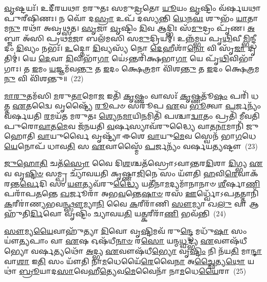 \-\ul{𑌵𑍃}\-𑌷𑍍𑌟𑌯𑌃᳴। 𑌉𑌦𑍀᳴𑌰𑌯𑌥𑌾 𑌮𑌰𑍁𑌤𑌃 𑌸𑌮𑍁\-\ul{𑌦𑍍𑌰}\-𑌤𑍋 \ul{𑌯𑍂}\-𑌯𑌂 \ul{𑌵𑍃}\-𑌷𑍍𑌟𑌿𑌂 𑌵᳴𑌰𑍍\mbox{}𑌷𑌯𑌥𑌾 𑌪𑍁𑌰𑍀𑌷𑌿𑌣𑌃। 𑌨 𑌵𑍋᳴ 𑌦\-\ul{𑌸𑍍𑌰𑌾} 𑌉𑌪᳴ 𑌦𑌸𑍍𑌯𑌨𑍍𑌤𑌿 \ul{𑌧𑍇}\-𑌨\-\ul{𑌵𑌃} 𑌶𑍁𑌭𑌂᳴ \ul{𑌯𑌾}\-𑌤𑌾𑌮\-\ul{𑌨𑍁} 𑌰𑌥𑌾᳴ 𑌅𑌵𑍃𑌥𑍍𑌸𑌤। \ul{𑌸𑍃}\-𑌜𑌾 \ul{𑌵𑍃}\-𑌷𑍍𑌟𑌿𑌂 \ul{𑌦𑌿}\-𑌵 𑌆𑌦𑍍𑌭𑌿𑌃 𑌸᳴\-\ul{𑌮𑍁}\-𑌦𑍍𑌰𑌂 𑌪𑍃᳴𑌣। \ul{𑌅}\-𑌬𑍍𑌜𑌾 𑌅᳴𑌸𑌿 𑌪𑍍𑌰𑌥\-\ul{𑌮}\-𑌜𑌾 𑌬𑌲᳴𑌮𑌸𑌿 𑌸\-\ul{𑌮𑍁}\-𑌦𑍍𑌰𑌿𑌯𑌮𑍍॑। 𑌉𑌨𑍍𑌨᳴𑌮𑍍𑌭𑌯 𑌪𑍃\-\ul{𑌥𑌿}\-𑌵𑍀\-\ul{𑌮𑍍𑌭𑌿}\-𑌨𑍍𑌦𑍍𑌧𑍀𑌦𑌂 \ul{𑌦𑌿}\-𑌵𑍍𑌯𑌂 𑌨𑌭𑌃᳴। \ul{𑌉}\-𑌦𑍍𑌨𑍋 \ul{𑌦𑌿}\-𑌵𑍍𑌯𑌸𑍍𑌯᳴ 𑌨𑍋 \ul{𑌦𑍇}\-𑌹𑍀𑌶𑌾᳴\-\ul{𑌨𑍋} 𑌵𑌿 𑌸𑍃᳴\-\ul{𑌜𑌾} 𑌦𑍃𑌤𑌿𑌮𑍍॑। 𑌯𑍇 \ul{𑌦𑍇}\-𑌵𑌾 \ul{𑌦𑌿}\-𑌵𑌿𑌭𑌾᳴\-\ul{𑌗𑌾} 𑌯𑍇॑\-𑌽𑌨𑍍𑌤𑌰𑌿᳴𑌕𑍍𑌷𑌭𑌾\-\ul{𑌗𑌾} 𑌯𑍇 𑌪𑍃᳴\-\ul{𑌥𑌿}\-𑌵𑌿𑌭𑌾᳴𑌗𑌾𑌃। 𑌤 \ul{𑌇}\-𑌮𑌂 \ul{𑌯}\-𑌜𑍍𑌞𑌮᳴𑌵\-\ul{𑌨𑍍𑌤𑍁} 𑌤 \ul{𑌇}\-𑌦𑌂 𑌕𑍍𑌷𑍇\-\ul{𑌤𑍍𑌰}\-𑌮𑌾 𑌵𑌿᳴𑌶\-\ul{𑌨𑍍𑌤𑍁} 𑌤 \ul{𑌇}\-𑌦𑌂 𑌕𑍍𑌷𑍇\-\ul{𑌤𑍍𑌰}\-𑌮\-\ul{𑌨𑍁} 𑌵𑌿 𑌵𑌿᳴𑌶𑌨𑍍𑌤𑍁॥~(22)

{\anuvakamend[{\-\ul{𑌯}\-\-\ul{𑌨𑍍𑌤𑌿} \ul{𑌦𑍇}\-𑌵𑌾 𑌵𑌿𑍞᳴𑌶\-\ul{𑌤𑌿}\-𑌶𑍍𑌚᳴}]}%

\-\ul{𑌮𑌾}\-\-\ul{𑌰𑍁}\-𑌤𑌮᳴𑌸𑌿 \ul{𑌮}\-𑌰𑍁\-\ul{𑌤𑌾}\-𑌮𑍋\-\ul{𑌜} 𑌇𑌤𑌿᳴ \ul{𑌕𑍃}\-𑌷𑍍𑌣𑌂 𑌵𑌾𑌸𑌃᳴ \ul{𑌕𑍃}\-𑌷𑍍𑌣𑌤𑍂᳴\-\ul{𑌷𑌂} 𑌪𑌰𑌿᳴ 𑌧𑌤𑍍𑌤 \ul{𑌏}\-𑌤𑌦𑍍𑌵𑍈 𑌵𑍃𑌷𑍍𑌟𑍍𑌯𑍈᳴ \ul{𑌰𑍂}\-𑌪𑍞 𑌸𑌰𑍂᳴𑌪 \ul{𑌏}\-𑌵 \ul{𑌭𑍂}\-𑌤𑍍𑌵𑌾 \ul{𑌪}\-𑌰𑍍𑌜𑌨𑍍𑌯𑌂᳴ 𑌵𑌰𑍍\mbox{}𑌷𑌯𑌤𑌿 \ul{𑌰}\-𑌮𑌯᳴𑌤 𑌮𑌰𑍁𑌤𑌃 \ul{𑌶𑍍𑌯𑍇}\-𑌨\-\ul{𑌮𑌾}\-𑌯𑌿\-\ul{𑌨}\-𑌮𑌿𑌤𑌿᳴ 𑌪𑌶𑍍𑌚𑌾\-\ul{𑌦𑍍𑌵𑌾}\-𑌤𑌂 𑌪𑍍𑌰𑌤𑌿᳴ 𑌮𑍀𑌵𑌤𑌿 𑌪𑍁𑌰𑍋\-\ul{𑌵𑌾}\-𑌤\-\ul{𑌮𑍇}\-𑌵 𑌜᳴𑌨𑌯𑌤𑌿 \ul{𑌵}\-𑌰𑍍\mbox{}𑌷𑌸𑍍𑌯𑌾𑌵᳴𑌰𑍁𑌦𑍍𑌧𑍍𑌯𑍈 𑌵𑌾𑌤\-\ul{𑌨𑌾}\-𑌮𑌾𑌨𑌿᳴ 𑌜𑍁𑌹𑍋𑌤𑌿 \ul{𑌵𑌾}\-𑌯𑍁𑌰𑍍𑌵𑍈 𑌵𑍃𑌷𑍍𑌟𑍍𑌯𑌾᳴ 𑌈𑌶𑍇 \ul{𑌵𑌾}\-𑌯𑍁\-\ul{𑌮𑍇}\-𑌵 𑌸𑍍𑌵𑍇𑌨᳴ 𑌭𑌾\-\ul{𑌗}\-𑌧𑍇\-\ul{𑌯𑍇}\-𑌨𑍋𑌪᳴ 𑌧𑌾𑌵\-\ul{𑌤𑌿} 𑌸 \ul{𑌏}\-𑌵𑌾𑌸𑍍𑌮𑍈᳴ \ul{𑌪}\-𑌰𑍍𑌜𑌨𑍍𑌯𑌂᳴ 𑌵𑌰𑍍\mbox{}𑌷𑌯\-\ul{𑌤𑍍𑌯}\-𑌷𑍍𑌟𑍗~(23)

\-\ul{𑌜𑍁}\-\-\ul{𑌹𑍋}\-\-\ul{𑌤𑌿} 𑌚𑌤᳴\-\ul{𑌸𑍍𑌰𑍋} 𑌵𑍈 𑌦𑌿\-\ul{𑌶}\-𑌶𑍍𑌚𑌤᳴𑌸𑍍𑌰𑍋\-𑌽𑌵𑌾𑌨𑍍𑌤𑌰\-\ul{𑌦𑌿}\-𑌶𑌾 \ul{𑌦𑌿}\-𑌗𑍍𑌭𑍍𑌯 \ul{𑌏}\-𑌵 𑌵𑍃\-\ul{𑌷𑍍𑌟𑌿}\-\-\ul{𑍞} 𑌸𑌮𑍍𑌪𑍍𑌰 𑌚𑍍𑌯𑌾᳴𑌵𑌯𑌤𑌿 𑌕𑍃𑌷𑍍𑌣𑌾\-\ul{𑌜𑌿}\-𑌨𑍇 𑌸𑌂 𑌯𑍗᳴𑌤𑌿 \ul{𑌹}\-𑌵𑌿\-\ul{𑌰𑍇}\-𑌵𑌾𑌕᳴𑌰𑌨𑍍𑌤\-\ul{𑌰𑍍𑌵𑍇}\-𑌦𑌿 𑌸𑌂 \ul{𑌯𑍗}\-𑌤𑍍𑌯𑌵᳴𑌰𑍁\-\ul{𑌦𑍍𑌧𑍍𑌯𑍈} 𑌯𑌤𑍀᳴𑌨𑌾\-\ul{𑌮}\-𑌦𑍍𑌯𑌮𑌾᳴𑌨𑌾𑌨𑌾𑍞 \ul{𑌶𑍀}\-𑌰𑍍\mbox{}𑌷𑌾\-\ul{𑌣𑌿} 𑌪𑌰𑌾᳴𑌪\-\ul{𑌤}\-𑌨𑍍𑌤𑍇 \ul{𑌖}\-𑌰𑍍𑌜𑍂𑌰𑌾᳴ 𑌅𑌭\-\ul{𑌵}\-𑌨𑍍𑌤𑍇\-\ul{𑌷𑌾}\-\-\ul{𑍞} 𑌰𑌸᳴ \ul{𑌊}\-𑌰𑍍𑌧𑍍𑌵𑍋᳴\-𑌽𑌪\-\ul{𑌤}\-𑌤𑍍𑌤𑌾𑌨𑌿᳴ \ul{𑌕}\-𑌰𑍀𑌰𑌾॑𑌣𑍍𑌯𑌭𑌵\-\ul{𑌨𑍍𑌥𑍍𑌸𑍗}\-𑌮𑍍𑌯𑌾\-\ul{𑌨𑌿} 𑌵𑍈 \ul{𑌕}\-𑌰𑍀𑌰𑌾᳴𑌣𑌿 \ul{𑌸𑍗}\-𑌮𑍍𑌯𑌾 𑌖\-\ul{𑌲𑍁} 𑌵𑌾 𑌆𑌹𑍁᳴𑌤𑌿\-\ul{𑌰𑍍𑌦𑌿}\-𑌵𑍋 𑌵𑍃𑌷𑍍𑌟𑌿𑌂᳴ 𑌚𑍍𑌯𑌾𑌵𑌯\-\ul{𑌤𑌿} 𑌯\-\ul{𑌤𑍍𑌕}\-𑌰𑍀𑌰𑌾᳴\-\ul{𑌣𑌿} 𑌭𑌵᳴𑌨𑍍𑌤𑌿~(24)

\-\ul{𑌸𑍗}\-𑌮𑍍𑌯\-\ul{𑌯𑍈}\-𑌵𑌾𑌹𑍁᳴𑌤𑍍𑌯𑌾 \ul{𑌦𑌿}\-𑌵𑍋 𑌵𑍃\-\ul{𑌷𑍍𑌟𑌿}\-𑌮𑌵᳴ 𑌰𑍁\-\ul{𑌨𑍍𑌦𑍍𑌧𑍇} 𑌮𑌧𑍁᳴\-\ul{𑌷𑌾} 𑌸𑌂 𑌯𑍗॑\-\ul{𑌤𑍍𑌯}\-𑌪𑌾𑌂 𑌵𑌾 \ul{𑌏}\-𑌷 𑌓𑌷᳴𑌧𑍀\-\ul{𑌨𑌾}\-\-\ul{𑍞} 𑌰\-\ul{𑌸𑍋} 𑌯𑌨𑍍𑌮\-\ul{𑌧𑍍𑌵}\-𑌦𑍍𑌭𑍍𑌯 \ul{𑌏}\-𑌵𑍗𑌷᳴𑌧𑍀𑌭𑍍𑌯𑍋 𑌵𑌰𑍍\mbox{}\-\ul{𑌷}\-𑌤𑍍𑌯𑌥𑍋᳴ \ul{𑌅}\-𑌦𑍍𑌭𑍍𑌯 \ul{𑌏}\-𑌵𑍗𑌷᳴𑌧𑍀\-\ul{𑌭𑍍𑌯𑍋} 𑌵𑍃\-\ul{𑌷𑍍𑌟𑌿𑌂} 𑌨𑌿 𑌨᳴𑌯\-\ul{𑌤𑌿} 𑌮𑌾\-\ul{𑌨𑍍𑌦𑌾} 𑌵𑌾\-\ul{𑌶𑌾} 𑌇\-\ul{𑌤𑌿} 𑌸𑌂 𑌯𑍗᳴𑌤𑌿 𑌨𑌾\-\ul{𑌮}\-𑌧𑍇𑌯𑍈᳴\-\ul{𑌰𑍇}\-𑌵𑍈\-\ul{𑌨𑌾} 𑌅\-\ul{𑌚𑍍𑌛𑍈}\-𑌤𑍍𑌯\-\ul{𑌥𑍋} 𑌯𑌥𑌾॑ \ul{𑌬𑍍𑌰𑍂}\-𑌯𑌾𑌦\-\ul{𑌸𑌾}\-𑌵𑍇𑌹𑍀\-\ul{𑌤𑍍𑌯𑍇}\-𑌵\-\ul{𑌮𑍇}\-𑌵𑍈𑌨𑌾᳴ 𑌨𑌾\-\ul{𑌮}\-𑌧𑍇\-\ul{𑌯𑍈}\-𑌰𑌾~(25)

